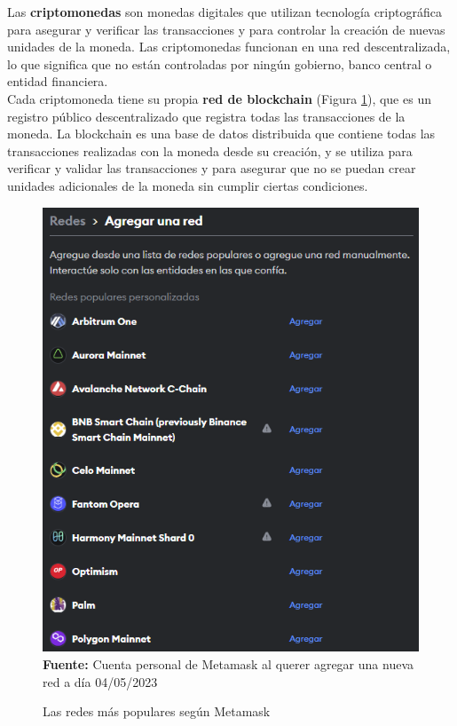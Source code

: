 Las \textbf{criptomonedas} son monedas digitales que utilizan tecnología 
criptográfica para asegurar y verificar las transacciones y para controlar 
la creación de nuevas unidades de la moneda. Las criptomonedas funcionan en una 
red descentralizada, lo que significa que no están controladas por ningún 
gobierno, banco central o entidad financiera.\\
\hfill \break
Cada criptomoneda tiene su propia \textbf{red de blockchain} (Figura \ref*{fig:redes}), 
que es un registro público descentralizado que registra todas las transacciones 
de la moneda. La blockchain es una base de datos distribuida que contiene 
todas las transacciones realizadas con la moneda desde su creación, y se 
utiliza para verificar y validar las transacciones y para asegurar que no 
se puedan crear unidades adicionales de la moneda sin cumplir ciertas 
condiciones.\\
\hfill \break
\begin{figure}[htb!]
    \caption{Las redes más populares según Metamask}
    \label{fig:redes}
    \centering
    \includegraphics[scale=0.75]{./Ilustraciones/redes.png}\\
    \textbf{Fuente:} Cuenta personal de Metamask al querer agregar una nueva red a día 04/05/2023
\end{figure}

